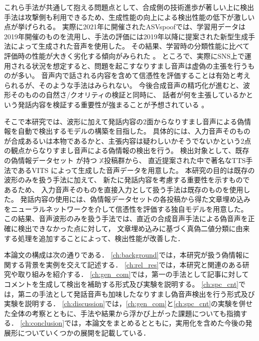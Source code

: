 これら手法が共通して抱える問題点として、合成側の技術進歩が著しい上に検出手法は攻撃側も利用できるため、生成性能の向上による検出性能の低下が激しい点が挙げられる。
実際に2021年に開催されたASVspoofでは、学習用データは2019年開催のものを流用し、手法の評価には2019年以降に提案された新型生成手法によって生成された音声を使用した。
その結果、学習時の分類性能に比べて評価時の性能が大きく劣化する傾向がみられた \cite{yamagishi21_asvspoof,yu_icmece}。
ところで、実際にSNS上で運用される状況を想定すると、問題を起こすなりすまし音声は虚偽の主張を行うものが多い。
音声内で話される内容を含めて信憑性を評価することは有効と考えられるが、そのような手法はみられない。
今後合成音声の精巧化が進むと、波形そのものの自然さ/クオリティの検証と同時に、
話者が何を主張しているかという発話内容を検証する重要性が強まることが予想されている \cite{10208955}。

そこで本研究では、波形に加えて発話内容の2面からなりすまし音声による偽情報を自動で検出するモデルの構築を目指した。
具体的には、入力音声そのものが合成あるいは本物であるかと、主張内容は疑わしいかそうでないかという2点の観点からなりすまし音声による偽情報の検出を行う。
検出対象として、既存の偽情報データセット \cite{10.1145/3477495.3531744}が持つ $\mathbb{X}$投稿群から、
直近提案された中で著名なTTS手法であるVITS \cite{pmlr-v139-kim21f}によって生成した音声データを用意した。
本研究の目的は既存の波形のみを扱う手法に加えて、
新たに発話内容を考慮する重要性を示すものであるため、
入力音声そのものを直接入力として扱う手法は既存のものを使用した。
発話内容の使用には、偽情報データセットの各投稿から得た文章埋め込みをニューラルネットワークを介して信憑性を評価する独自モデルを用意した。
この結果、音声波形のみを扱う手法では、直近の合成音声手法による偽音声を正確に検出できなかった点に対して，
文章埋め込みに基づく真偽二値分類に由来する処理を追加することによって、検出性能が改善した．


本論文の構成は次の通りである．
\cref{ch:background}では，本研究が扱う偽情報に関する背景を実例を交えて記述する．
\cref{ch:rel_res}では，本研究と関連のある研究や取り組みを紹介する．
\cref{ch:gen_com}では，第一の手法として記事に対してコメントを生成して検出を補助する形式及び実験を説明する。
\cref{ch:spc_cnt}では，第ニの手法として発話音声も加味したなりすまし偽音声検出を行う形式及び実験を説明する．
\cref{ch:discussion}では，\cref{ch:gen_com}と\cref{ch:spc_cnt}の実験を併せた全体の考察とともに、手法や結果から浮かび上がった課題についても指摘する．
\cref{ch:conclusion}では，本論文をまとめるとともに，実用化を含めた今後の発展形についていくつかの展開を記載している．